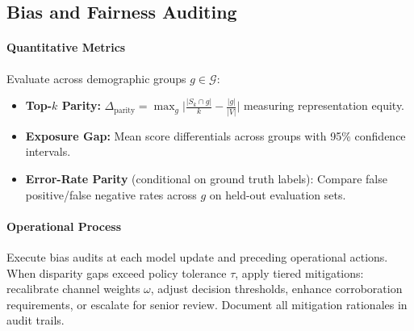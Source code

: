 \documentclass[12pt]{article}
\theoremstyle{plain}
\begin{document}
\subsection{Bias and Fairness Auditing}
\label{subsec:bias}
\paragraph{Quantitative Metrics} Evaluate across demographic groups $g\in\mathcal{G}$:
\begin{itemize}\itemsep0.2em
\item \textbf{Top-$k$ Parity:} $\Delta_{\text{parity}}=\max_g \big|\frac{|S_k\cap g|}{k}-\frac{|g|}{|V|}\big|$ measuring representation equity.
\item \textbf{Exposure Gap:} Mean score differentials across groups with 95\% confidence intervals.
\item \textbf{Error-Rate Parity} (conditional on ground truth labels): Compare false positive/false negative rates across $g$ on held-out evaluation sets.
\end{itemize}
\paragraph{Operational Process} Execute bias audits at each model update and preceding operational actions. When disparity gaps exceed policy tolerance $\tau$, apply tiered mitigations: recalibrate channel weights $\omega$, adjust decision thresholds, enhance corroboration requirements, or escalate for senior review. Document all mitigation rationales in audit trails.
\end{document}
